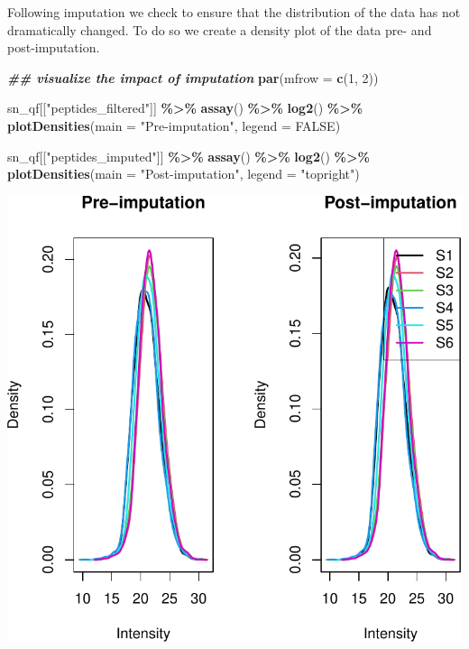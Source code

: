 \documentclass[9pt,a4paper,]{extarticle}
\newenvironment{Shaded}{\begin{snugshade}}{\end{snugshade}}
\newcommand{\AttributeTok}[1]{\textcolor[rgb]{0.13,0.29,0.53}{#1}}
\newcommand{\ConstantTok}[1]{\textcolor[rgb]{0.56,0.35,0.01}{#1}}
\newcommand{\DecValTok}[1]{\textcolor[rgb]{0.00,0.00,0.81}{#1}}
\newcommand{\DocumentationTok}[1]{\textcolor[rgb]{0.56,0.35,0.01}{\textbf{\textit{#1}}}}
\newcommand{\FunctionTok}[1]{\textcolor[rgb]{0.13,0.29,0.53}{\textbf{#1}}}
\newcommand{\NormalTok}[1]{#1}
\newcommand{\SpecialCharTok}[1]{\textcolor[rgb]{0.81,0.36,0.00}{\textbf{#1}}}
\newcommand{\StringTok}[1]{\textcolor[rgb]{0.31,0.60,0.02}{#1}}
\begin{document}
Following imputation we check to ensure that the distribution of the data has
not dramatically changed. To do so we create a density plot of the data pre- and
post-imputation.

\begin{Shaded}
\begin{Highlighting}[]
\DocumentationTok{\#\# visualize the impact of imputation}
\FunctionTok{par}\NormalTok{(}\AttributeTok{mfrow =} \FunctionTok{c}\NormalTok{(}\DecValTok{1}\NormalTok{, }\DecValTok{2}\NormalTok{))}

\NormalTok{sn\_qf[[}\StringTok{"peptides\_filtered"}\NormalTok{]] }\SpecialCharTok{\%\textgreater{}\%}
  \FunctionTok{assay}\NormalTok{() }\SpecialCharTok{\%\textgreater{}\%}
  \FunctionTok{log2}\NormalTok{() }\SpecialCharTok{\%\textgreater{}\%}
  \FunctionTok{plotDensities}\NormalTok{(}\AttributeTok{main =} \StringTok{"Pre{-}imputation"}\NormalTok{,}
                \AttributeTok{legend =} \ConstantTok{FALSE}\NormalTok{)}

\NormalTok{sn\_qf[[}\StringTok{"peptides\_imputed"}\NormalTok{]] }\SpecialCharTok{\%\textgreater{}\%}
  \FunctionTok{assay}\NormalTok{() }\SpecialCharTok{\%\textgreater{}\%}
  \FunctionTok{log2}\NormalTok{() }\SpecialCharTok{\%\textgreater{}\%}
  \FunctionTok{plotDensities}\NormalTok{(}\AttributeTok{main =} \StringTok{"Post{-}imputation"}\NormalTok{,}
                \AttributeTok{legend =} \StringTok{"topright"}\NormalTok{)}
\end{Highlighting}
\end{Shaded}

\begin{center}\includegraphics[width=0.8\linewidth]{workflow_expressions_files/figure-latex/lfq_imputation_4-1} \end{center}
\end{document}
